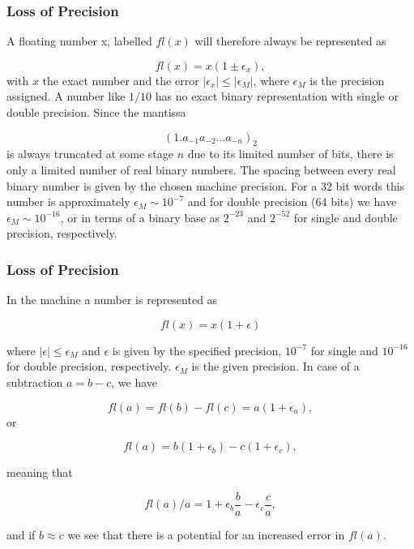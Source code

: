 \documentclass[handout]{beamer}
\newenvironment{block_mdfboxadmon}[1][]{\begin{block}{#1}}{\end{block}}
\begin{document}
\begin{frame}
\frametitle{Loss of Precision}

\begin{block_mdfboxadmon}
A floating number x, labelled $fl(x)$ will therefore always be represented as

\begin{equation}
  fl(x) = x(1\pm \epsilon_x),
\end{equation}
with $x$ the exact number and the error $|\epsilon_x| \le |\epsilon_M|$, where
$\epsilon_M$ is the precision assigned. A number like $1/10$ has no exact binary representation
with single or double precision. Since the mantissa

\[
\left(1.a_{-1}a_{-2}\dots a_{-n}\right)_2
\]
is always truncated at some stage $n$ due to its limited number of bits, there is only a
limited number of real binary numbers. The spacing between every real binary number is given by the
chosen machine precision.
For a 32 bit words this number is approximately
$ \epsilon_M \sim 10^{-7}$ and for double precision (64 bits) we have
$ \epsilon_M \sim 10^{-16}$, or in terms of a binary base
as $2^{-23}$ and $2^{-52}$ for single and double precision, respectively.
\end{block_mdfboxadmon}
\end{frame}

\begin{frame}
\frametitle{Loss of Precision}

\begin{block_mdfboxadmon}
In the machine a number is represented as

\begin{equation}
  fl(x)= x(1+\epsilon)
\end{equation}

where $|\epsilon| \leq \epsilon_M$ and $\epsilon$ is given by the
specified precision, $10^{-7}$ for single and $10^{-16}$ for double
precision, respectively.
$\epsilon_M$ is the given precision.
In case of a subtraction $a=b-c$, we have

\begin{equation}
   fl(a)=fl(b)-fl(c) = a(1+\epsilon_a),
\end{equation}
or

\begin{equation}
   fl(a)=b(1+\epsilon_b)-c(1+\epsilon_c),
\end{equation}

meaning that

\begin{equation}
   fl(a)/a=1+\epsilon_b\frac{b}{a}- \epsilon_c\frac{c}{a},
\end{equation}

and if $b\approx c$ we see that there is a potential for an increased
error in $fl(a)$.
\end{block_mdfboxadmon}
\end{frame}
\end{document}
